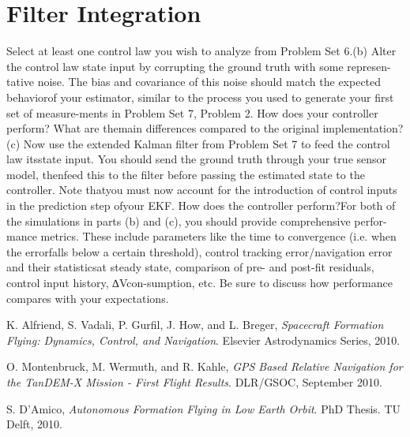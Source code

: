\documentclass[11pt,letterpaper]{article}
\begin{document}
\section{Filter Integration}
Select at least one control law you wish to analyze from Problem Set 6.(b)  Alter the control law state input by corrupting the ground truth with some represen-tative noise.  The bias and covariance of this noise should match the expected behaviorof your estimator, similar to the process you used to generate your first set of measure-ments in Problem Set 7, Problem 2.  How does your controller perform?  What are themain differences compared to the original implementation?(c)  Now use the extended Kalman filter from Problem Set 7 to feed the control law itsstate input.  You should send the ground truth through your true sensor model, thenfeed this to the filter before passing the estimated state to the controller.  Note thatyou must now account for the introduction of control inputs in the prediction step ofyour EKF. How does the controller perform?For both of the simulations in parts (b) and (c), you should provide comprehensive perfor-mance metrics.  These include parameters like the time to convergence (i.e.  when the errorfalls below a certain threshold), control tracking error/navigation error and their statisticsat  steady  state,  comparison  of  pre-  and  post-fit  residuals,  control  input  history,  ∆Vcon-sumption, etc.  Be sure to discuss how performance compares with your expectations.



% 

\newpage
\begin{thebibliography}{9}
K. Alfriend, S. Vadali, P. Gurfil, J. How, and L. Breger, \textit{Spacecraft Formation Flying: Dynamics, Control, and Navigation}. Elsevier Astrodynamics Series, 2010. 

O. Montenbruck, M. Wermuth, and R. Kahle,
\textit{GPS Based Relative Navigation for the TanDEM-X Mission - First Flight Results}. DLR/GSOC, September 2010.

S. D'Amico, \textit{Autonomous Formation Flying
in Low Earth Orbit}. PhD Thesis. TU Delft, 2010.

% 

\end{thebibliography}
\end{document}
